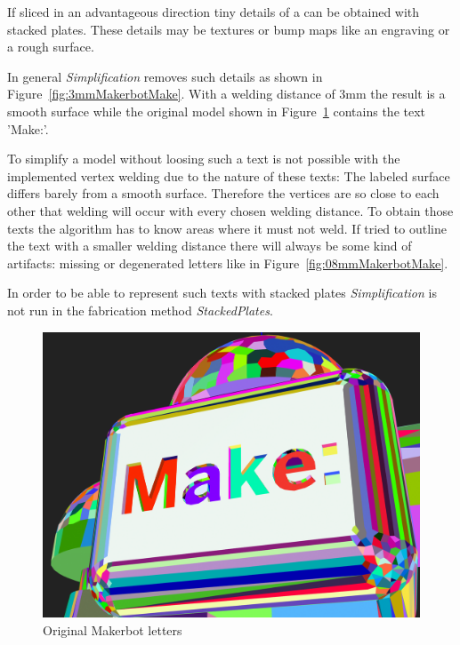 \documentclass[../ClassicThesis.tex]{subfiles}
\begin{document}
If sliced in an advantageous direction tiny details of a {\threedmodel} can be obtained with stacked plates. These details may be textures or bump maps like an engraving or a rough surface.

In general \emph{Simplification} removes such details as shown in Figure~\ref{fig:3mmMakerbotMake}. With a welding distance of 3mm the result is a smooth surface while the original model shown in Figure~\ref{fig:origMakerbotMake} contains the text 'Make:'.

To simplify a model without loosing such a text is not possible with the implemented vertex welding due to the nature of these texts: The labeled surface differs barely from a smooth surface. Therefore the vertices are so close to each other that welding will occur with every chosen welding distance. To obtain those texts the algorithm has to know areas where it must not weld. If tried to outline the text with a smaller welding distance there will always be some kind of artifacts: missing or degenerated letters like in Figure~\ref{fig:08mmMakerbotMake}.

In order to be able to represent such texts with stacked plates \emph{Simplification} is not run in the fabrication method \emph{StackedPlates}.


\begin{figure}
\includegraphics[width=0.8\columnwidth]{Images/04-approx-welding-make-unwelded.png}
\caption{Original Makerbot letters}
\label{fig:origMakerbotMake}
\end{figure}
\end{document}
